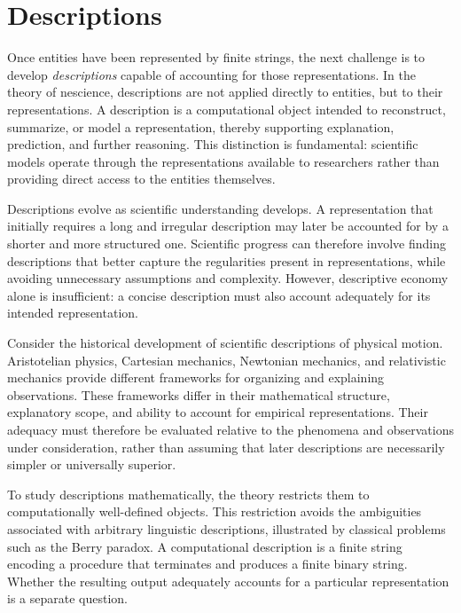 %
%

\section{Descriptions}
\label{sec:intro_descriptions}

Once entities have been represented by finite strings, the next challenge is to develop \emph{descriptions} capable of accounting for those representations. In the theory of nescience, descriptions are not applied directly to entities, but to their representations. A description is a computational object intended to reconstruct, summarize, or model a representation, thereby supporting explanation, prediction, and further reasoning. This distinction is fundamental: scientific models operate through the representations available to researchers rather than providing direct access to the entities themselves.

Descriptions evolve as scientific understanding develops. A representation that initially requires a long and irregular description may later be accounted for by a shorter and more structured one. Scientific progress can therefore involve finding descriptions that better capture the regularities present in representations, while avoiding unnecessary assumptions and complexity. However, descriptive economy alone is insufficient: a concise description must also account adequately for its intended representation.

\begin{example}
Consider the historical development of scientific descriptions of physical motion. Aristotelian physics, Cartesian mechanics, Newtonian mechanics, and relativistic mechanics provide different frameworks for organizing and explaining observations. These frameworks differ in their mathematical structure, explanatory scope, and ability to account for empirical representations. Their adequacy must therefore be evaluated relative to the phenomena and observations under consideration, rather than assuming that later descriptions are necessarily simpler or universally superior.
\end{example}

To study descriptions mathematically, the theory restricts them to computationally well-defined objects. This restriction avoids the ambiguities associated with arbitrary linguistic descriptions, illustrated by classical problems such as the Berry paradox. A computational description is a finite string encoding a procedure that terminates and produces a finite binary string. Whether the resulting output adequately accounts for a particular representation is a separate question.

